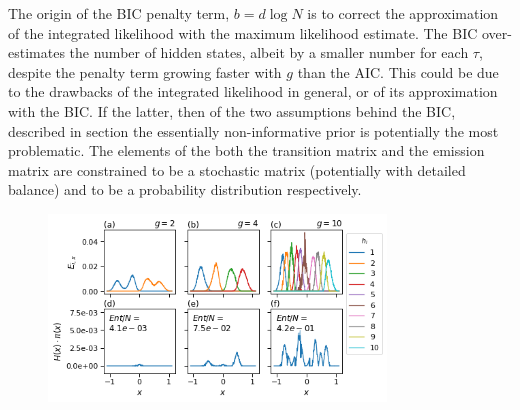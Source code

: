 The origin of the BIC penalty term, $b=d\log{N}$ is to correct the approximation of the integrated likelihood with the maximum likelihood estimate. The BIC over-estimates the number of hidden states, albeit by a smaller number for each $\tau$, despite the penalty term growing faster with $g$ than the AIC. This could be due to the drawbacks of the integrated likelihood in general, or of its approximation with the BIC. If the latter, then of the two assumptions behind the BIC, described in section \label{sec:bic} the essentially non-informative prior is potentially the most problematic.  The elements of the both the transition matrix and the emission matrix are constrained to be a stochastic matrix (potentially with detailed balance) and to be a probability distribution respectively. 

\begin{figure}
    \centering
    \includegraphics[width=0.8\textwidth]{chapters/hmm_selection/figures/prinz_entropy.png}
    \label{fig:prinz_ent}
\end{figure}


